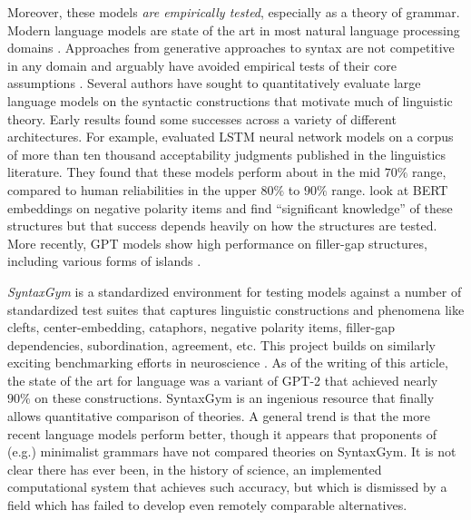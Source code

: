 \documentclass[output=paper,colorlinks,citecolor=brown
]{langscibook}
\begin{document}

\begin{sloppypar}
Moreover, these models \textit{are empirically tested}, especially as a theory of grammar. Modern language models are state of the art in most natural language processing domains \citep{bommasani2021opportunities}. Approaches from generative approaches to syntax are not competitive in any domain and arguably have avoided empirical tests of their core assumptions \citep{edelman2003seriously}. Several authors have sought to quantitatively evaluate large language models on the syntactic constructions that motivate much of linguistic theory. Early results found some successes across a variety of different architectures. For example, \citet{warstadt2019neural} evaluated LSTM neural network models on a corpus of more than ten thousand acceptability judgments published in the linguistics literature. They found that these models perform about in the mid $70\%$ range, compared to human reliabilities in the upper $80\%$ to $90\%$ range. \citet{warstadt2019investigating} look at BERT embeddings on negative polarity items and find ``significant knowledge'' of these structures but that success depends heavily on how the structures are tested. More recently, GPT models show high performance on filler-gap structures, including various forms of islands \citep{wilcox2018rnn,wilcox2022using}.
\end{sloppypar}

 \textit{SyntaxGym} is a standardized environment for testing models against a number of standardized test suites that captures linguistic constructions and phenomena like clefts, center-embedding, cataphors, negative polarity items, filler-gap dependencies, subordination, agreement, etc. This project builds on similarly exciting benchmarking efforts in neuroscience \citep{schrimpf2020integrative}. As of the writing of this article, the state of the art for language was a variant of GPT-2 that achieved nearly $90\%$ on these constructions. SyntaxGym is an ingenious resource that finally allows quantitative comparison of theories. A general trend is that the more recent language models perform better, though it appears that proponents of (e.g.) minimalist grammars have not compared theories on SyntaxGym. It is not clear there has ever been, in the history of science, an implemented computational system that achieves such accuracy, but which is dismissed by a field which has failed to develop even remotely comparable alternatives.
\end{document}
